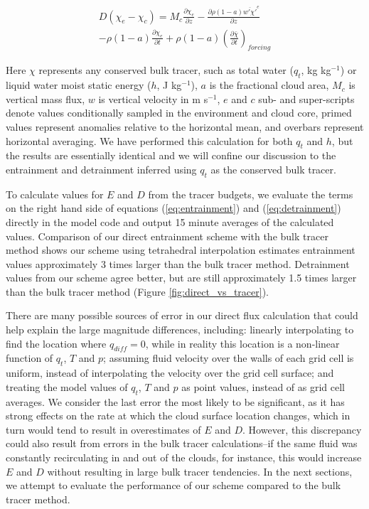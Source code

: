 \documentclass[12pt]{article}
\begin{document}
\begin{equation}
  \label{eq:detrainment}
  \begin{split}
    D (\chi_e - \chi_c)
    = M_c \frac{\partial \chi_e}{\partial z}
    - \frac{\partial \rho (1 - a) \overline{w' \chi'}^e}{\partial z} \\
    - \rho (1 - a) \frac{\partial \chi_e}{\partial t}
    + \rho (1 - a) \left(\frac{\partial \bar{\chi}}{\partial t}\right)_{forcing}
  \end{split}
\end{equation}

Here $\chi$ represents any conserved bulk tracer, such as total water ($q_t$, 
kg kg$^{-1}$) or liquid water moist static energy ($h$, J kg$^{-1}$), $a$ is 
the fractional cloud area, $M_c$ is vertical mass flux, $w$ is vertical 
velocity in m s$^{-1}$, $e$ and $c$ sub- and super-scripts denote values 
conditionally sampled in the environment and cloud core, primed values represent 
anomalies relative to the horizontal mean, and overbars represent horizontal 
averaging.  We have performed this calculation for both $q_t$ and $h$, but the 
results are essentially identical and we will confine our discussion to the 
entrainment and detrainment inferred using $q_t$ as the conserved bulk tracer.  

To calculate values for $E$ and $D$ from the tracer budgets, we evaluate the 
terms on the right hand side of equations (\ref{eq:entrainment}) and 
(\ref{eq:detrainment}) directly in the model code and output 15 minute averages 
of the calculated values.  Comparison of our direct entrainment scheme with the 
bulk tracer method shows our scheme using tetrahedral interpolation estimates
entrainment values approximately 3 times larger than the bulk tracer method.
Detrainment values from our scheme agree better, but are still approximately 
1.5 times larger than the bulk tracer method (Figure 
\ref{fig:direct_vs_tracer}).

There are many possible sources of error in our direct flux calculation that 
could help explain the large magnitude differences, including: linearly
interpolating to find the location where $q_{diff} = 0$, while in reality this
location is a non-linear function of $q_t$, $T$ and $p$; assuming fluid velocity
over the walls of each grid cell is uniform, instead of interpolating the 
velocity over the grid cell surface; and treating the model values of $q_t$, 
$T$ and $p$ as point values, instead of as grid cell averages.  We consider the
last error the most likely to be significant, as it has strong effects on the 
rate at which the cloud surface location changes, which in turn would tend to 
result in overestimates of $E$ and $D$.  However, this discrepancy could also
result from errors in the bulk tracer calculations--if the same fluid was 
constantly recirculating in and out of the clouds, for instance, this would 
increase $E$ and $D$ without resulting in large bulk tracer tendencies.  In the
next sections, we attempt to evaluate the performance of our scheme compared to 
the bulk tracer method.
\end{document}
